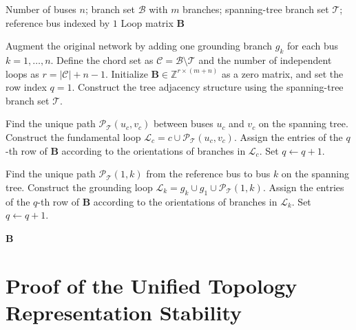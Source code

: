 \documentclass[journal]{IEEEtran}
\begin{document}
\begin{algorithm}[!htbp]
\caption{Construction of the Loop Matrix $\mathbf{B}$}
\label{alg:buildB}
\begin{algorithmic}[1]
\REQUIRE Number of buses $n$; branch set $\mathcal{B}$ with $m$ branches; spanning-tree branch set $\mathcal{T}$; reference bus indexed by $1$
\ENSURE Loop matrix $\mathbf{B}$

\STATE Augment the original network by adding one grounding branch $g_k$ for each bus $k=1,\ldots,n$.
\STATE Define the chord set as $\mathcal{C}=\mathcal{B}\setminus\mathcal{T}$ and the number of independent loops as $r=|\mathcal{C}|+n-1$.
\STATE Initialize $\mathbf{B}\in\mathbb{Z}^{r\times(m+n)}$ as a zero matrix, and set the row index $q=1$.
\STATE Construct the tree adjacency structure using the spanning-tree branch set $\mathcal{T}$.

    \STATE Find the unique path $\mathcal{P}_{\mathcal{T}}(u_c,v_c)$ between buses $u_c$ and $v_c$ on the spanning tree.
    \STATE Construct the fundamental loop $\mathcal{L}_c = c \cup \mathcal{P}_{\mathcal{T}}(u_c,v_c)$.
    \STATE Assign the entries of the $q$-th row of $\mathbf{B}$ according to the orientations of branches in $\mathcal{L}_c$.
    \STATE Set $q \leftarrow q+1$.
\ENDFOR

    \STATE Find the unique path $\mathcal{P}_{\mathcal{T}}(1,k)$ from the reference bus to bus $k$ on the spanning tree.
    \STATE Construct the grounding loop $\mathcal{L}_k = g_k \cup g_1 \cup \mathcal{P}_{\mathcal{T}}(1,k)$.
    \STATE Assign the entries of the $q$-th row of $\mathbf{B}$ according to the orientations of branches in $\mathcal{L}_k$.
    \STATE Set $q \leftarrow q+1$.
\ENDFOR

\RETURN $\mathbf{B}$
\end{algorithmic}
\end{algorithm}

\section{Proof of the Unified Topology Representation Stability}

\end{document}
